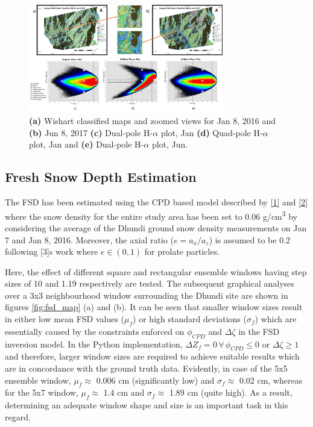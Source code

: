 \documentclass{article}
\begin{document}
\begin{figure}[htb]
\centering
\includegraphics[width=8.5cm]{All_Wishart.png}
\vspace{-2ex}
\caption{\textbf{(a)} Wishart classified maps and zoomed views for Jan 8, 2016 and \textbf{(b)} Jun 8, 2017 \textbf{(c)} Dual-pole H-$\alpha$ plot, Jan \textbf{(d)} Quad-pole H-$\alpha$ plot, Jan and \textbf{(e)} Dual-pole H-$\alpha$ plot, Jun.}
\label{fig:wishart}
\end{figure}

\subsection{Fresh Snow Depth Estimation}
\label{ssec:fsde}

The FSD has been estimated using the CPD based model described by \eqref{1} and \eqref{2} where the snow density for the entire study area has been set to 0.06 g/cm\textsuperscript{3} by considering the average of the Dhundi ground snow density measurements on Jan 7 and Jan 8, 2016. Moreover, the axial ratio ($e=a_x/a_z$) is assumed to be  0.2  following [3]\textquotesingle s work where $e \in (0,1)$ for prolate particles.

Here, the effect of different square and rectangular ensemble windows having step sizes of 10 and 1.19 respectively are tested. The subsequent graphical analyses over a 3x3 neighbourhood window surrounding the Dhundi site are shown in figures \ref{fig:fsd_map}{ (a) and (b)}. It can be seen that smaller window sizes result in either low mean FSD values ($\mu_f$) or high standard deviations ($\sigma_f$) which are essentially caused by the constraints enforced on $\phi_{CPD}$ and $\Delta{\zeta}$ in the FSD inversion model. In the Python implementation, $\Delta{Z_f} = 0 \, \forall \, \phi_{CPD} \le 0 \text{ or } \Delta{\zeta} \ge 1$ and therefore, larger window sizes are required to achieve suitable results which are in concordance with the ground truth data. Evidently, in case of the 5x5 ensemble window, $\mu_f \approx$ 0.006 cm (significantly low) and $\sigma_f \approx$ 0.02 cm, whereas for the 5x7 window, $\mu_f \approx$ 1.4 cm and $\sigma_f \approx$ 1.89 cm (quite high). As a result, determining an adequate window shape and size is an important task in this regard.
\end{document}
